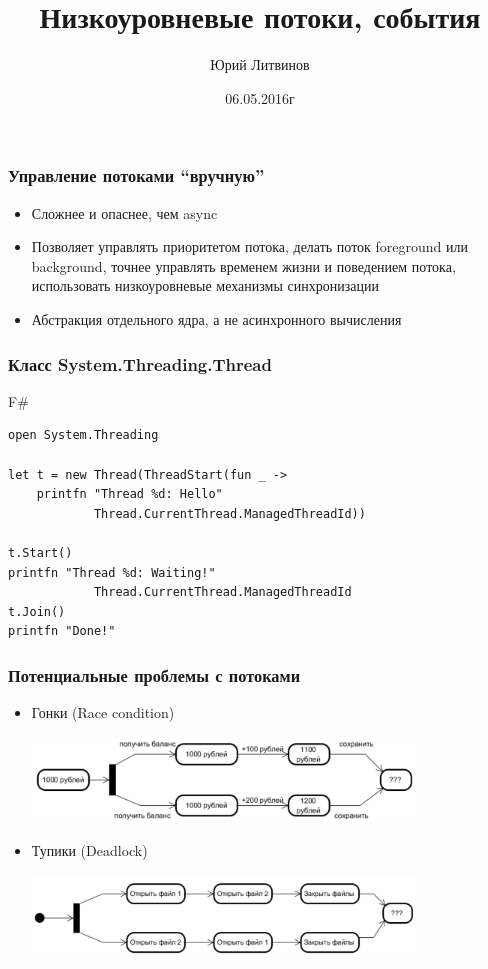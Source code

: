 \documentclass[xetex,mathserif,serif]{beamer}
\title{Низкоуровневые потоки, события}
\author{Юрий Литвинов}
\date{06.05.2016г}
\begin{document}
    \frame{\titlepage}

    \begin{frame}
        \frametitle{Управление потоками ``вручную''}
        \begin{itemize}
            \item Сложнее и опаснее, чем async
            \item Позволяет управлять приоритетом потока, делать поток 
                foreground или background, точнее управлять временем жизни
                и поведением потока, использовать низкоуровневые механизмы
                синхронизации
            \item Абстракция отдельного ядра, а не асинхронного вычисления
        \end{itemize}
    \end{frame}
    
    \begin{frame}[fragile]
        \frametitle{Класс System.Threading.Thread}
        \begin{exampleblock}{F\#}
            \begin{lstlisting}
open System.Threading

let t = new Thread(ThreadStart(fun _ ->
    printfn "Thread %d: Hello" 
            Thread.CurrentThread.ManagedThreadId))

t.Start()
printfn "Thread %d: Waiting!" 
            Thread.CurrentThread.ManagedThreadId
t.Join()
printfn "Done!"
\end{lstlisting}
\end{exampleblock}
\end{frame}

    \begin{frame}
        \frametitle{Потенциальные проблемы с потоками}
        \begin{itemize}
            \item Гонки (Race condition)
                \begin{center}
                    \includegraphics[width=0.8\textwidth]{raceCondition.png}
                \end{center}
                \vspace{1cm}
            \item Тупики (Deadlock)
                \begin{center}
                    \includegraphics[width=0.8\textwidth]{deadlock.png}
                \end{center}
        \end{itemize}
    \end{frame}
    
\end{document}
